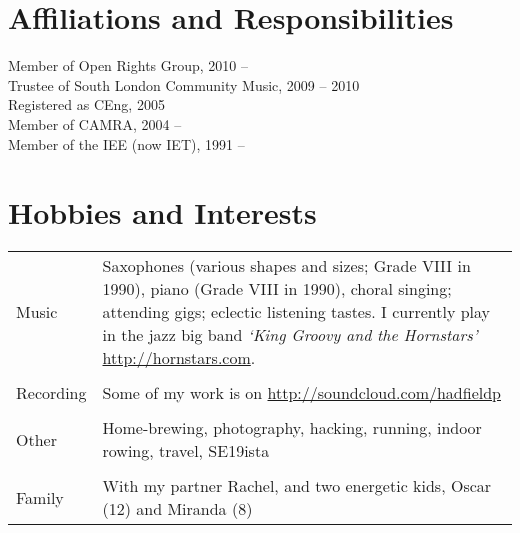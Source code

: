 \documentclass[line]{resume}
\begin{document}
\begin{resume}
    \section{\mysidestyle Affiliations and Responsibilities}

    Member of Open Rights Group, 2010 --                                                              \vspace{0.5mm}\\%
    Trustee of South London Community Music, 2009 -- 2010                                             \vspace{0.5mm}\\%
    Registered as CEng, 2005                                                                          \vspace{0.5mm}\\%
    Member of CAMRA, 2004 --                                                                          \vspace{0.5mm}\\%
    Member of the IEE (now IET), 1991 --

    \section{\mysidestyle Hobbies and Interests}
    \vspace{1.5mm}
    \begin{table}[ht]
        \begin{tabular}{p{2cm} p{12cm}}
        {Music}&{Saxophones (various shapes and sizes; Grade VIII in 1990), piano (Grade VIII in 1990), choral singing;
                 attending gigs; eclectic listening tastes. I currently play in the jazz big band \textsl{`King Groovy
                 and the Hornstars'} \url{http://hornstars.com}. }\\                                     \vspace{0.5mm}\\%
        {Recording}&{Some of my work is on \url{http://soundcloud.com/hadfieldp}}\\
                                                                                                      \vspace{0.5mm}\\%
        {Other}&{Home-brewing, photography, hacking, running, indoor rowing, travel, SE19ista}\\        \vspace{0.5mm}\\%
        {Family}&{With my partner Rachel, and two energetic kids, Oscar (12) and Miranda (8)}\\
        \end{tabular}
    \end{table}

\end{resume}
\end{document}
